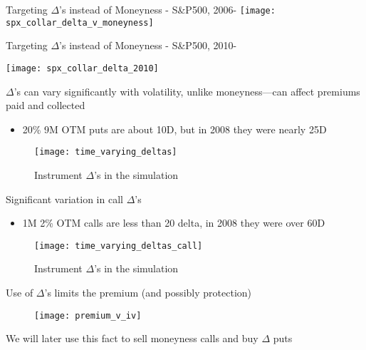 \documentclass{beamer}
\begin{document}
\begin{frame}{Targeting $\Delta$'s instead of Moneyness - S\&P500, 2006-}
\texttt{[image: spx\_collar\_delta\_v\_moneyness]}
\end{frame}

\begin{frame}{Targeting $\Delta$'s instead of Moneyness - S\&P500, 2010-}


\texttt{[image: spx\_collar\_delta\_2010]}
\end{frame}

\begin{frame}{$\Delta$'s can vary significantly with volatility, unlike moneyness---can affect premiums paid and collected}

\begin{itemize}
\item 20\% 9M OTM puts are about 10D, but in 2008 they were nearly 25D
\end{itemize}

\begin{figure}
\caption{Instrument $\Delta$'s in the simulation}
\texttt{[image: time\_varying\_deltas]}
\end{figure}

\end{frame}

\begin{frame}{Significant variation in call $\Delta$'s}

\begin{itemize}
\item 1M 2\% OTM calls are less than 20 delta, in 2008 they were over 60D
\end{itemize}

\begin{figure}
\caption{Instrument $\Delta$'s in the simulation}
\texttt{[image: time\_varying\_deltas\_call]}
\end{figure}

\end{frame}

\begin{frame}{Use of $\Delta$'s limits the premium (and possibly protection)}
\begin{figure}
\texttt{[image: premium\_v\_iv]}
\end{figure}
We will later use this fact to sell moneyness calls and buy $\Delta$ puts
\end{frame}
\end{document}
